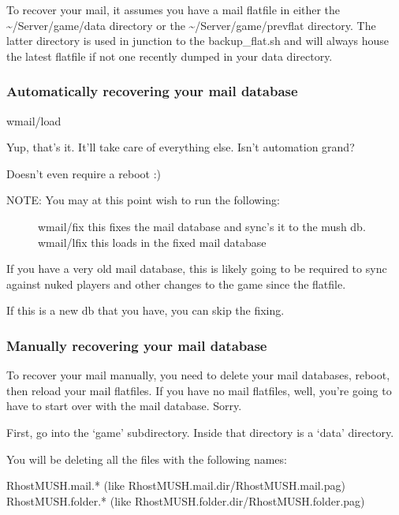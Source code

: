 \documentclass[letterpaper,10pt,english]{sphinxmanual}
\begin{document}
\sphinxAtStartPar
To recover your mail, it assumes you have a mail flatfile in either the
\textasciitilde{}/Server/game/data directory or the \textasciitilde{}/Server/game/prevflat directory.  The
latter directory is used in junction to the backup\_flat.sh and will always
house the latest flatfile if not one recently dumped in your data directory.


\subsubsection{Automatically recovering your mail database}
\label{\detokenize{troubleshooting:automatically-recovering-your-mail-database}}
\sphinxAtStartPar
wmail/load

\sphinxAtStartPar
Yup, that’s it.  It’ll take care of everything else.  Isn’t automation grand?

\sphinxAtStartPar
Doesn’t even require a reboot :)
\begin{description}
\item[{NOTE:  You may at this point wish to run the following:}] \leavevmode
\sphinxAtStartPar
wmail/fix  \textendash{} this fixes the mail database and sync’s it to the mush db.
wmail/lfix \textendash{} this loads in the fixed mail database

\end{description}

\sphinxAtStartPar
If you have a very old mail database, this is likely going to be required
to sync against nuked players and other changes to the game since the flatfile.

\sphinxAtStartPar
If this is a new db that you have, you can skip the fixing.


\subsubsection{Manually recovering your mail database}
\label{\detokenize{troubleshooting:manually-recovering-your-mail-database}}
\sphinxAtStartPar
To recover your mail manually, you need to delete your mail databases,
reboot, then reload your mail flatfiles.  If you have no mail flatfiles,
well, you’re going to have to start over with the mail database.  Sorry.

\sphinxAtStartPar
First, go into the ‘game’ subdirectory.  Inside that directory is a ‘data’
directory.

\sphinxAtStartPar
You will be deleting all the files with the following names:

\sphinxAtStartPar
RhostMUSH.mail.*                (like RhostMUSH.mail.dir/RhostMUSH.mail.pag)
RhostMUSH.folder.*              (like RhostMUSH.folder.dir/RhostMUSH.folder.pag)
\end{document}
